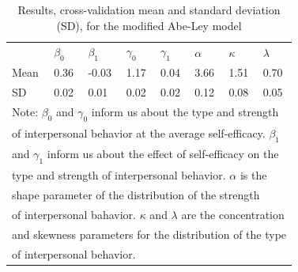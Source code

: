 \documentclass[man]{apa6}
\begin{document}
\begin{table}
\begin{tabular}[t]{lllllll}
\end{tabular}
\end{table}

\begin{table}

\caption{\label{tab:estAL}Results, cross-validation mean and standard deviation (SD), for the modified Abe-Ley model}
\centering
\begin{tabular}[t]{llllllll}
\toprule
& $\beta_0$ & $\beta_1$ & $\gamma_0$  & $\gamma_1$ & $\alpha$ & $\kappa$ & $\lambda$\\
Mean & 0.36 & -0.03 & 1.17 & 0.04 & 3.66 & 1.51 & 0.70 \\
SD & 0.02 & 0.01 & 0.02 & 0.02 & 0.12 & 0.08 & 0.05\\
\bottomrule
\multicolumn{8}{l}{Note: $\beta_0$  and $\gamma_0$ inform us about the type and strength }\\
\multicolumn{8}{l}{of interpersonal behavior at the average self-efficacy. $\beta_1$ }\\
\multicolumn{8}{l}{and $\gamma_1$ inform us about the effect of self-efficacy on the}\\
\multicolumn{8}{l}{type and strength of interpersonal behavior. $\alpha$ is the } \\
\multicolumn{8}{l}{shape parameter of the distribution of the strength }\\
\multicolumn{8}{l}{of interpersonal bahavior. $\kappa$ and $\lambda$ are the concentration}\\
\multicolumn{8}{l}{and skewness parameters for the distribution of the type}\\
\multicolumn{8}{l}{of interpersonal behavior.}\\
\end{tabular}
\end{table}
\end{document}
